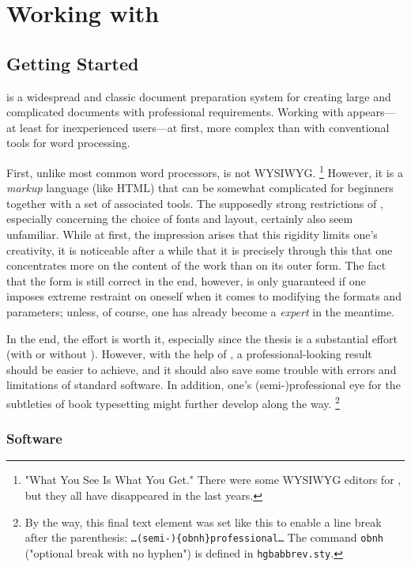 \chapter{Working with \latex}
\label{cha:WorkingWithLatex}


\section{Getting Started}
\label{sec:LatexGettingStarted}

\latex is a widespread and classic document preparation system for creating
large and complicated documents with professional requirements. Working with
\latex appears---at least for inexperienced users---at first, more complex
than with conventional tools for word processing.

First, unlike most common word processors, \latex is not \textsc{WYSIWYG}.%
\footnote{"What You See Is What You Get." There were some \textsc{WYSIWYG}
editors for \latex, but they all have disappeared in the last years.}
However, it is a \emph{markup} language (like HTML) that can be somewhat
complicated for beginners together with a set of associated tools. The
supposedly strong restrictions of \latex, especially concerning the choice of
fonts and layout, certainly also seem unfamiliar. While at first, the impression
arises that this rigidity limits one's creativity, it is noticeable after a
while that it is precisely through this that one concentrates more on the
content of the work than on its outer form. The fact that the form is still
correct in the end, however, is only guaranteed if one imposes extreme
restraint on oneself when it comes to modifying the formats and parameters;
unless, of course, one has already become a \latex \emph{expert} in the
meantime.

In the end, the effort is worth it, especially since the thesis is a substantial
effort (with or without \latex). However, with the help of \latex, a
professional-looking result should be easier to achieve, and it should also save
some trouble with errors and limitations of standard software. In addition, one's
(semi-){\obnh}professional eye for the subtleties of book typesetting might
further develop along the way.%
\footnote{By the way, this final text element was set like this to enable a line
break after the parenthesis: \texttt{\ldots (semi-)\{{\bs}obnh\}professional\ldots}
The command \texttt{{\bs}obnh} ("optional break with no hyphen") is defined in
\texttt{hgbabbrev.sty}.}

\subsection{Software}
\label{sec:Software}


